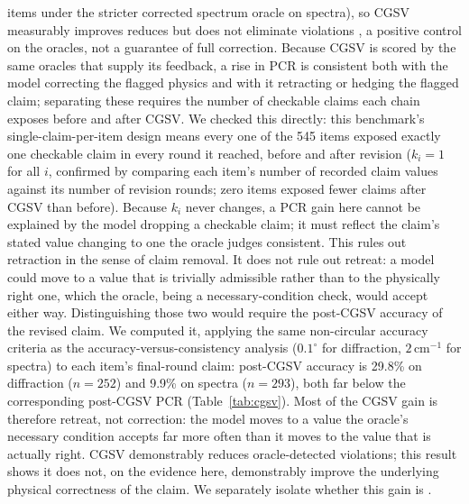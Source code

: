 \documentclass[pdflatex,sn-nature]{sn-jnl}
\newcommand{\rev}[1]{#1} %
\newcommand{\rev}[1]{{\color{blue}#1}} %
\providecommand{\DIFadd}[1]{{\protect\color{blue} \sf #1}} %
\providecommand{\DIFdel}[1]{{\protect\color{red} \scriptsize #1}} %
\providecommand{\DIFaddbegin}{} %
\providecommand{\DIFaddend}{} %
\providecommand{\DIFdelbegin}{} %
\providecommand{\DIFdelend}{} %
\providecommand{\DIFscaledelfig}{0.5}
\newlength{\DIFdelgraphicswidth} %
\newlength{\DIFdelgraphicsheight} %
\providecommand{\DIFaddincludegraphics}[2][]{{\color{blue}\fbox{\DIFOincludegraphics[#1]{#2}}}} %
\providecommand{\DIFdelincludegraphics}[2][]{%
\sbox{\DIFdelgraphicsbox}{\DIFOincludegraphics[#1]{#2}}%
\settoboxwidth{\DIFdelgraphicswidth}{\DIFdelgraphicsbox} %
\settoboxtotalheight{\DIFdelgraphicsheight}{\DIFdelgraphicsbox} %
\scalebox{\DIFscaledelfig}{%
\parbox[b]{\DIFdelgraphicswidth}{\usebox{\DIFdelgraphicsbox}\\[-\baselineskip] \rule{\DIFdelgraphicswidth}{0em}}\llap{\resizebox{\DIFdelgraphicswidth}{\DIFdelgraphicsheight}{%
\setlength{\unitlength}{\DIFdelgraphicswidth}%
\begin{picture}(1,1)%
\thicklines\linethickness{2pt} %
{\color[rgb]{1,0,0}\put(0,0){\framebox(1,1){}}}%
{\color[rgb]{1,0,0}\put(0,0){\line( 1,1){1}}}%
{\color[rgb]{1,0,0}\put(0,1){\line(1,-1){1}}}%
\end{picture}%
}\hspace*{3pt}}} %
} %
\DeclareRobustCommand{\DIFaddbegin}{\DIFOaddbegin \let\includegraphics\DIFaddincludegraphics} %
\DeclareRobustCommand{\DIFaddend}{\DIFOaddend \let\includegraphics\DIFOincludegraphics} %
\DeclareRobustCommand{\DIFdelbegin}{\DIFOdelbegin \let\includegraphics\DIFdelincludegraphics} %
\DeclareRobustCommand{\DIFdelend}{\DIFOaddend \let\includegraphics\DIFOincludegraphics} %
\begin{document}
items \DIFdelbegin \DIFdel{under the stricter corrected spectrum oracle}\DIFdelend \DIFaddbegin \DIFadd{\rev{on spectra}}\DIFaddend ), so CGSV \DIFdelbegin \DIFdel{measurably improves }\DIFdelend \DIFaddbegin \DIFadd{reduces }\DIFaddend but does not eliminate violations\DIFdelbegin \DIFdel{, a positive
control on the oracles, not a guarantee of full correction.
Because CGSV is scored by the same oracles that supply its feedback, a rise in PCR is
consistent both with the model correcting the flagged physics and with it retracting or
hedging the flagged claim; separating these requires the number of checkable claims each
chain exposes before and after CGSV. We checked this directly: this benchmark's
single-claim-per-item design means every one of the 545 items exposed exactly one
checkable claim in every round it reached, before and after revision ($k_i=1$ for all $i$,
confirmed by comparing each item's number of recorded claim values against its number of
revision rounds; zero items exposed fewer claims after CGSV than before). Because $k_i$
never changes, a PCR gain here cannot be explained by the model dropping a checkable claim;
it must reflect the claim's stated value changing to one the oracle judges consistent. This
rules out retraction in the sense of claim removal. It does not rule out retreat: a model
could move to a value that is trivially admissible rather than to the physically right one,
which the oracle, being a necessary-condition check, would accept either way. Distinguishing
those two would require the post-CGSV accuracy of the revised claim. We computed it, applying
the same non-circular accuracy criteria as the accuracy-versus-consistency analysis
($0.1^\circ$ for diffraction, $2\,\mathrm{cm}^{-1}$ for spectra) to each item's final-round
claim: post-CGSV accuracy is 29.8\% on diffraction ($n=252$) and 9.9\% on spectra ($n=293$),
both far below the corresponding post-CGSV PCR (Table~\ref{tab:cgsv}). Most of the CGSV gain
is therefore retreat, not correction: the model moves to a value the oracle's necessary
condition accepts far more often than it moves to the value that is actually right. CGSV
demonstrably reduces oracle-detected violations; this result shows it does not, on the
evidence here, demonstrably improve the underlying physical correctness of the claim. We separately isolate whether this gain is
}\DIFdelend \DIFaddbegin \DIFadd{.
}
\end{document}
